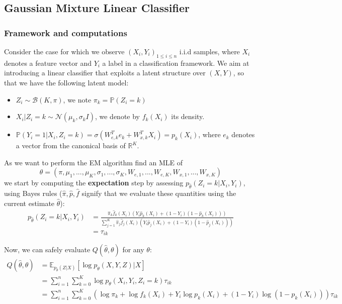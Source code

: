 \subsection{Gaussian Mixture Linear Classifier}

\subsubsection{Framework and computations}
Consider the case for which we observe $(X_i, Y_i)_{1 \leq i \leq n}$ i.i.d samples, where $X_i$ denotes a feature vector and $Y_i$ a label in a classification framework.
We aim at introducing a linear classifier that exploits a latent structure over $(X, Y)$, so that we have the following latent model:
\begin{itemize}
    \item $Z_i \sim \mathcal{B}(K, \pi)$, we note $\pi_k = \mathbb{P}(Z_i = k)$
    \item $X_i|Z_i=k \sim \mathcal{N}(\mu_k, \sigma_k I)$, we denote by $f_k(X_i)$ its density.
    \item $\mathbb{P}(Y_i = 1 | X_i, Z_i=k) = \sigma(W_{e,k}^T e_k + W_{x,k}^T X_i) = p_k(X_i)$, where $e_k$ denotes a vector from the canonical basis of $\mathbb{R}^K$.
\end{itemize}

As we want to perform the EM algorithm find an MLE of
$$
\theta = (\pi, \mu_1, ..., \mu_K, \sigma_1, ..., \sigma_K, W_{e,1}, ..., W_{e,K}, W_{x,1}, ..., W_{x,K})
$$
we start by computing the \textbf{expectation} step by assessing $p_{\widehat{\theta}}(Z_i = k|X_i,Y_i)$, using Bayes rules ($\hat{\pi}, \hat{p}, \hat{f}$ signify that we evaluate these quantities using the current estimate $\widehat{\theta}$):
$$
\begin{align}
    p_{\widehat{\theta}}(Z_i = k|X_i, Y_i) &= \frac{\hat{\pi}_k \hat{f}_k(X_i) \left(Y_i \hat{p}_k(X_i) + (1 - Y_i) (1 - \hat{p}_k(X_i)) \right)}{\sum_{j=1}^K \hat{\pi}_j \hat{f}_j(X_i) \left(Y_i \hat{p}_j(X_i) + (1 - Y_i) (1 - \hat{p}_j(X_i)) \right)}
    \\&= \tau_{ik}
\end{align}
$$

Now, we can safely evaluate $Q(\widehat{\theta}, \theta)$ for any $\theta$:
$$
\begin{align}
    Q(\widehat{\theta}, \theta) &= \mathbb{E}_{p_{\widehat{\theta}}(Z|X)}[\log p_{\theta}(X, Y, Z) | X] \\
    &= \sum_{i=1}^n \sum_{k=0}^K \log p_{\theta}(X_i, Y_i, Z_i = k) \tau_{ik} \\
    &= \sum_{i=1}^n \sum_{k=0}^K (\log \pi_k + \log f_k(X_i) + Y_i \log p_k(X_i) + (1 - Y_i) \log (1-p_k(X_i))) \tau_{ik} \\
\end{align}
$$

